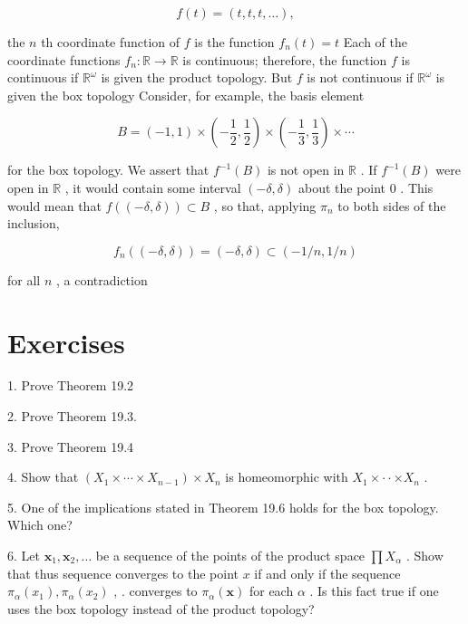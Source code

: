 \documentclass[10pt]{article}
\begin{document}
\[
f\left( t\right)  = \left( {t,t,t,\ldots }\right) ,
\]

the \(n\) th coordinate function of \(f\) is the function \({f}_{n}\left( t\right)  = t\) Each of the coordinate functions \({f}_{n} : \mathbb{R} \rightarrow  \mathbb{R}\) is continuous; therefore, the function \(f\) is continuous if \({\mathbb{R}}^{\omega }\) is given the product topology. But \(f\) is not continuous if \({\mathbb{R}}^{\omega }\) is given the box topology Consider, for example, the basis element

\[
B = \left( {-1,1}\right)  \times  \left( {-\frac{1}{2},\frac{1}{2}}\right)  \times  \left( {-\frac{1}{3},\frac{1}{3}}\right)  \times  \cdots
\]

for the box topology. We assert that \({f}^{-1}\left( B\right)\) is not open in \(\mathbb{R}\) . If \({f}^{-1}\left( B\right)\) were open in \(\mathbb{R}\) , it would contain some interval \(\left( {-\delta ,\delta }\right)\) about the point 0 . This would mean that \(f\left( \left( {-\delta ,\delta }\right) \right)  \subset  B\) , so that, applying \({\pi }_{n}\) to both sides of the inclusion,

\[
{f}_{n}\left( \left( {-\delta ,\delta }\right) \right)  = \left( {-\delta ,\delta }\right)  \subset  \left( {-1/n,1/n}\right)
\]

for all \(n\) , a contradiction

\section*{Exercises}

1. Prove Theorem 19.2

2. Prove Theorem 19.3.

3. Prove Theorem 19.4

4. Show that \(\left( {{X}_{1} \times  \cdots  \times  {X}_{n - 1}}\right)  \times  {X}_{n}\) is homeomorphic with \({X}_{1} \times   \cdot   \cdot   \times  {X}_{n}\) .

5. One of the implications stated in Theorem 19.6 holds for the box topology. Which one?

6. Let \({\mathbf{x}}_{1},{\mathbf{x}}_{2},\ldots\) be a sequence of the points of the product space \(\prod {X}_{\alpha }\) . Show that thus sequence converges to the point \(x\) if and only if the sequence \({\pi }_{\alpha }\left( {x}_{1}\right) ,{\pi }_{\alpha }\left( {x}_{2}\right)\) , . converges to \({\pi }_{\alpha }\left( \mathbf{x}\right)\) for each \(\alpha\) . Is this fact true if one uses the box topology instead of the product topology?
\end{document}
